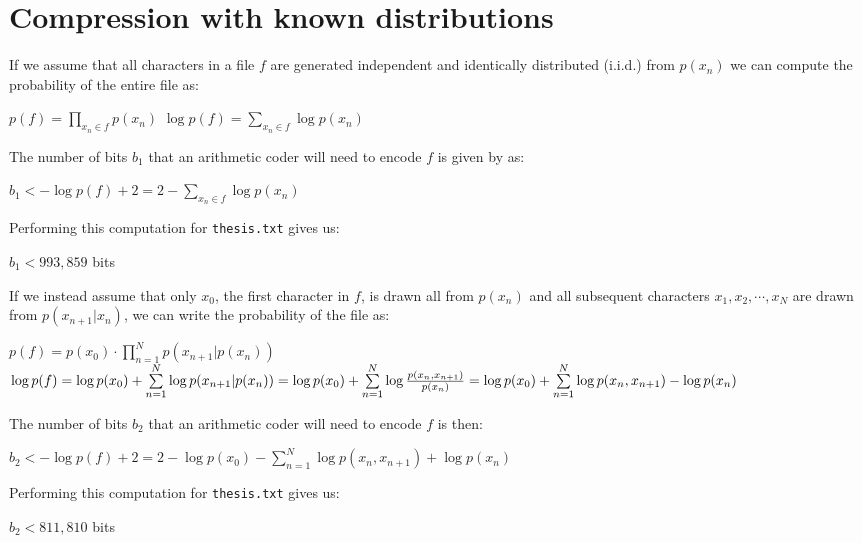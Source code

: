 \documentclass[10pt,a4paper,oneside,onecolumn]{article}
\newcommand*{\thesisTXT}{{\tt thesis.txt}\xspace}
\newcommand*{\iid}{i.i.d.\xspace}
\begin{document}
\section{Compression with known distributions}\label{sec:ex3}

If we assume that all characters in a file $f$ are generated independent and
identically distributed (\iid) from $p(x_n)$ we can compute the probability of
the entire file as:

\begin{center}
    $p(f) = \prod\limits_{x_n \in f} p(x_n)$
    $\log p(f) = \sum\limits_{x_n \in f} \log p(x_n)$
\end{center}

The number of bits $b_1$ that an arithmetic coder will need to encode $f$
is given by \cite[p.~21]{it4} as:

\begin{center}
    $b_1 < -\log p(f) + 2 = 2 - \sum\limits_{x_n \in f} \log p(x_n)$
\end{center}

Performing this computation for \thesisTXT gives us:

\begin{center}
    $b_1 < 993,859$ bits
\end{center}

If we instead assume that only $x_0$, the first character in $f$, is drawn all
from $p(x_n)$ and all subsequent characters $x_1, x_2, \cdots, x_N$ are drawn
from $p(x_{n+1} | x_n)$, we can write the probability of the file as:

\begin{center}
    $p(f) = p(x_0) \cdot \prod\limits_{n = 1}^{N} p(x_{n + 1} | p(x_n))$
    $ \log p(f)
    = \log p(x_0) + \sum\limits_{n = 1}^{N} \log p(x_{n + 1} | p(x_n))
    = \log p(x_0) + \sum\limits_{n = 1}^{N} \log {p(x_n, x_{n + 1}) \over p(x_n)}
    = \log p(x_0) + \sum\limits_{n = 1}^{N} \log p(x_n, x_{n + 1}) - \log p(x_n)$
\end{center}

The number of bits $b_2$ that an arithmetic coder will need to encode $f$
is then:

\begin{center}
    $b_2 < -\log p(f) + 2
    = 2 - \log p(x_0) - \sum\limits_{n = 1}^{N} \log p(x_n, x_{n + 1}) + \log p(x_n)$
\end{center}

Performing this computation for \thesisTXT gives us:

\begin{center}
    $b_2 < 811,810$ bits
\end{center}
\end{document}
